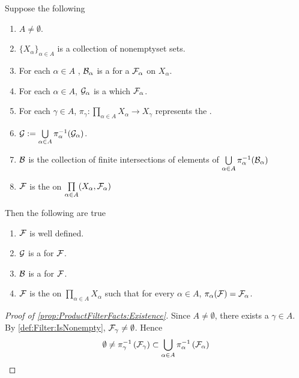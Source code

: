\begin{prop}
    \label{prop:ProductFilterFacts}
    Suppose the following
\begin{enumerate}
    \item $A \neq \emptyset$.
    \item $\{X_\alpha\}_{\alpha \in A}$ is a collection of nonemptyset sets. 
    \item For each $\alpha \in A$
    , $\mathcal{B}_\alpha$ is a \FilterBase for a \Filter $\mathcal{F}_\alpha$ on $X_\alpha$.
    \item For each $\alpha \in A$, $\mathcal{G}_\alpha$ is a \FilterSubbasis
    which \FilterGenerates $\mathcal{F}_\alpha$. 
    \item For each $\gamma \in A$, $\pi_\gamma : \prod\limits_{\alpha \in A} X_\alpha \to  X_\gamma$ represents the \ProjectionMap. 
    \item $\mathcal{G}:=\bigcup\limits_{\alpha \in A} \pi_\alpha^{-1}(\mathcal{G}_\alpha)$. 
    \item $\mathcal{B}$ is the collection of finite intersections of elements of 
        $\bigcup\limits_{\alpha \in A} \pi_{\alpha}^{-1}(\mathcal{B}_\alpha)$
    \item $\mathcal{F}$ is the \ProductFilter on $\prod\limits_{\alpha \in A} (X_\alpha, \mathcal{F}_\alpha)$
\end{enumerate}
Then the following are true 
\begin{enumerate}[label=(\roman*), ref={\ref{prop:ProductFilterFacts}.~\roman*}]
\item \label{prop:ProductFilterFacts:Existence} $\mathcal{F}$ is well defined. 
\item \label{prop:ProductFilterFacts:Subbasis} $\mathcal{G}$ is a \FilterSubbasis for $\mathcal{F}$. 
\item \label{prop:ProductFilterFacts:Base} $\mathcal{B}$ is a \FilterBase for $\mathcal{F}$. 
\item \label{prop:ProductFilterFacts:Characterization} $\mathcal{F}$ is the \CoarsestFilter \Filter on $\prod\limits_{\alpha \in A} X_\alpha$ such that 
for every $\alpha \in A$, $\pi_\alpha (\mathcal{F}) = \mathcal{F}_\alpha$. 
\end{enumerate}
\begin{proof}[Proof of \ref{prop:ProductFilterFacts:Existence}]
    Since $A \neq \emptyset$, there exists a $\gamma \in A$. 
    By \ref{def:Filter:IsNonempty}, $\mathcal{F}_\gamma \neq \emptyset$. 
    Hence 
    \begin{equation*}
       \emptyset \neq \pi_\gamma^{-1}\left( \mathcal{F}_\gamma\right) \subset  \bigcup\limits_{\alpha \in A} \pi_\alpha^{-1}\left( \mathcal{F}_\alpha\right)
    \end{equation*}

\end{proof}
\end{prop}
